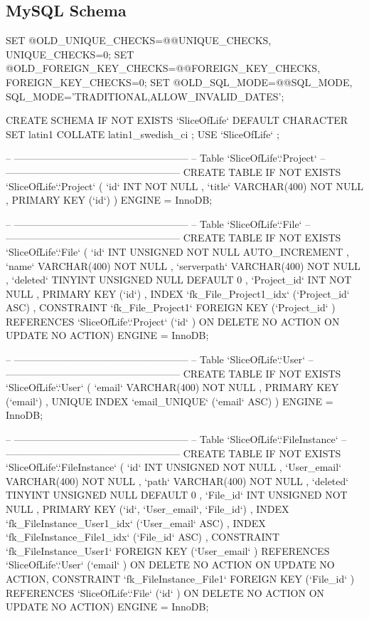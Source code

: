 \subsection{MySQL Schema}
\begin{spverbatim}
SET @OLD_UNIQUE_CHECKS=@@UNIQUE_CHECKS, UNIQUE_CHECKS=0;
SET @OLD_FOREIGN_KEY_CHECKS=@@FOREIGN_KEY_CHECKS, FOREIGN_KEY_CHECKS=0;
SET @OLD_SQL_MODE=@@SQL_MODE, SQL_MODE='TRADITIONAL,ALLOW_INVALID_DATES';

CREATE SCHEMA IF NOT EXISTS `SliceOfLife` DEFAULT CHARACTER SET latin1 COLLATE latin1_swedish_ci ;
USE `SliceOfLife` ;

-- -----------------------------------------------------
-- Table `SliceOfLife`.`Project`
-- -----------------------------------------------------
CREATE  TABLE IF NOT EXISTS `SliceOfLife`.`Project` (
  `id` INT NOT NULL ,
  `title` VARCHAR(400) NOT NULL ,
  PRIMARY KEY (`id`) )
ENGINE = InnoDB;


-- -----------------------------------------------------
-- Table `SliceOfLife`.`File`
-- -----------------------------------------------------
CREATE  TABLE IF NOT EXISTS `SliceOfLife`.`File` (
  `id` INT UNSIGNED NOT NULL AUTO_INCREMENT ,
  `name` VARCHAR(400) NOT NULL ,
  `serverpath` VARCHAR(400) NOT NULL ,
  `deleted` TINYINT UNSIGNED NULL DEFAULT 0 ,
  `Project_id` INT NOT NULL ,
  PRIMARY KEY (`id`) ,
  INDEX `fk_File_Project1_idx` (`Project_id` ASC) ,
  CONSTRAINT `fk_File_Project1`
    FOREIGN KEY (`Project_id` )
    REFERENCES `SliceOfLife`.`Project` (`id` )
    ON DELETE NO ACTION
    ON UPDATE NO ACTION)
ENGINE = InnoDB;


-- -----------------------------------------------------
-- Table `SliceOfLife`.`User`
-- -----------------------------------------------------
CREATE  TABLE IF NOT EXISTS `SliceOfLife`.`User` (
  `email` VARCHAR(400) NOT NULL ,
  PRIMARY KEY (`email`) ,
  UNIQUE INDEX `email_UNIQUE` (`email` ASC) )
ENGINE = InnoDB;


-- -----------------------------------------------------
-- Table `SliceOfLife`.`FileInstance`
-- -----------------------------------------------------
CREATE  TABLE IF NOT EXISTS `SliceOfLife`.`FileInstance` (
  `id` INT UNSIGNED NOT NULL ,
  `User_email` VARCHAR(400) NOT NULL ,
  `path` VARCHAR(400) NOT NULL ,
  `deleted` TINYINT UNSIGNED NULL DEFAULT 0 ,
  `File_id` INT UNSIGNED NOT NULL ,
  PRIMARY KEY (`id`, `User_email`, `File_id`) ,
  INDEX `fk_FileInstance_User1_idx` (`User_email` ASC) ,
  INDEX `fk_FileInstance_File1_idx` (`File_id` ASC) ,
  CONSTRAINT `fk_FileInstance_User1`
    FOREIGN KEY (`User_email` )
    REFERENCES `SliceOfLife`.`User` (`email` )
    ON DELETE NO ACTION
    ON UPDATE NO ACTION,
  CONSTRAINT `fk_FileInstance_File1`
    FOREIGN KEY (`File_id` )
    REFERENCES `SliceOfLife`.`File` (`id` )
    ON DELETE NO ACTION
    ON UPDATE NO ACTION)
ENGINE = InnoDB;



\end{spverbatim}
